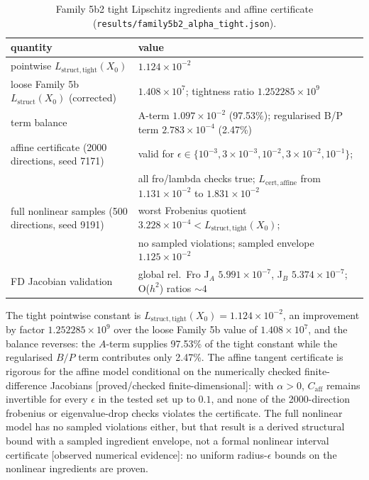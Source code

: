 \documentclass[12pt]{article}
\newcommand{\FDL}{\textnormal{[proved/checked finite-dimensional]}}
\newcommand{\OBS}{\textnormal{[observed numerical evidence]}}
\begin{document}
\begin{table}[htbp]
\centering
\small
\caption{Family 5b2 tight Lipschitz ingredients and affine certificate
(\texttt{results/family5b2\_alpha\_tight.json}).}
\label{tab:f5b2}
\begin{tabular}{l l}
\toprule
quantity & value \\
\midrule
pointwise $L_{\mathrm{struct,tight}}(X_0)$ &
$1.124\times10^{-2}$ \\
loose Family 5b $L_{\mathrm{struct}}(X_0)$ (corrected) &
$1.408\times10^7$; tightness ratio $1.252285\times10^9$ \\
term balance & A-term $1.097\times10^{-2}$ (97.53\%);
regularised B/P term $2.783\times10^{-4}$ (2.47\%) \\
affine certificate (2000 directions, seed 7171) &
valid for $\epsilon\in\{10^{-3},3\times10^{-3},10^{-2},3\times10^{-2},10^{-1}\}$; \\
 & all fro/lambda checks true; $L_{\mathrm{cert,affine}}$ from
$1.131\times10^{-2}$ to $1.831\times10^{-2}$ \\
full nonlinear samples (500 directions, seed 9191) &
worst Frobenius quotient $3.228\times10^{-4}<L_{\mathrm{struct,tight}}(X_0)$; \\
 & no sampled violations; sampled envelope $1.125\times10^{-2}$ \\
FD Jacobian validation & global rel.\ Fro J$_A$ $5.991\times10^{-7}$,
J$_B$ $5.374\times10^{-7}$; O($h^2$) ratios $\sim4$ \\
\bottomrule
\end{tabular}
\end{table}

The tight pointwise constant is $L_{\mathrm{struct,tight}}(X_0)=1.124\times10^{-2}$,
an improvement by factor $1.252285\times10^9$ over the loose Family 5b value
of $1.408\times10^7$, and the balance reverses: the $A$-term supplies 97.53\%
of the tight constant while the regularised $B/P$ term contributes only
2.47\%. The affine tangent certificate is rigorous for the affine model
conditional on the numerically checked finite-difference Jacobians \FDL{}:
with $\alpha>0$, $C_{\mathrm{aff}}$ remains invertible for every
$\epsilon$ in the tested set up to $0.1$, and none of the 2000-direction
frobenius or eigenvalue-drop checks violates the certificate. The full
nonlinear model has no sampled violations either, but that result is a
derived structural bound with a sampled ingredient envelope, not a formal
nonlinear interval certificate \OBS{}: no uniform radius-$\epsilon$ bounds
on the nonlinear ingredients are proven.
\end{document}
